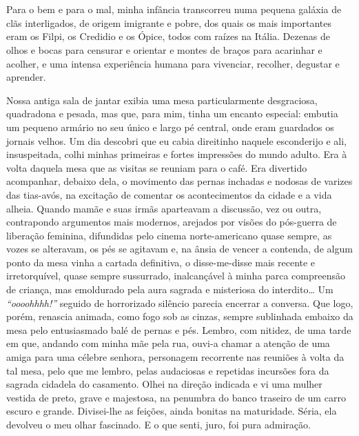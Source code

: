 \chapter{}
Para o bem e para o mal, minha infância transcorreu numa pequena galáxia de clãs interligados, de origem imigrante e pobre, dos quais os mais importantes eram os Filpi, os Credidio e os Ópice, todos com raízes na Itália. 
Dezenas de olhos e bocas para censurar e orientar e montes de braços para acarinhar e acolher, e uma intensa experiência humana para vivenciar, recolher, degustar e aprender. 

Nossa antiga sala de jantar exibia uma mesa particularmente desgraciosa, quadradona e pesada, mas que, para mim, tinha um encanto especial: embutia um pequeno armário no seu único e largo pé central, onde eram guardados os jornais velhos. 
Um dia descobri que eu cabia direitinho naquele esconderijo e ali, insuspeitada, colhi minhas primeiras e fortes impressões do mundo adulto.  
Era à volta daquela mesa que as visitas se reuniam para o café. 
Era divertido acompanhar, debaixo dela, o movimento das pernas inchadas e nodosas de varizes das tias-avós, na excitação de comentar os acontecimentos da cidade e a vida alheia. 
Quando mamãe e suas irmãs aparteavam a discussão, vez ou outra, contrapondo argumentos mais modernos, arejados por visões do pós-guerra de liberação feminina, difundidas pelo cinema norte-americano quase sempre, as vozes se alteravam, os pés se agitavam e, na ânsia de vencer a contenda, de algum ponto da mesa vinha a cartada definitiva, o disse-me-disse mais recente e irretorquível, quase sempre sussurrado, inalcançável à minha parca compreensão de criança, mas emoldurado pela aura sagrada e misteriosa do interdito\dots 
Um \textit{``oooohhhh!''} seguido de horrorizado silêncio parecia encerrar a conversa. 
Que logo, porém, renascia animada, como fogo sob as cinzas, sempre sublinhada embaixo da mesa pelo entusiasmado balé de pernas e pés. 
Lembro, com nitidez, de uma tarde em que, andando com minha mãe pela rua, ouvi-a chamar a atenção de uma amiga para uma célebre senhora, personagem recorrente nas reuniões à volta da tal mesa, pelo que me lembro, pelas audaciosas e repetidas incursões fora da sagrada cidadela do casamento. 
Olhei na direção indicada e vi uma mulher vestida de preto, grave e majestosa, na penumbra do banco traseiro de um carro escuro e grande.
Divisei-lhe as feições, ainda bonitas na maturidade. 
Séria, ela devolveu o meu olhar fascinado. E o que senti, juro, foi pura admiração.


